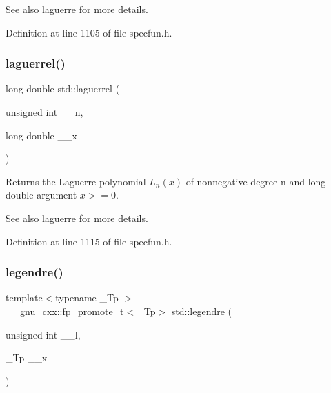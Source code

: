 \begin{DoxySeeAlso}{See also}
\hyperlink{group__tr29124__math__spec__func_ga9d7b24a11dad27690387405548973ef9}{laguerre} for more details. 
\end{DoxySeeAlso}


Definition at line 1105 of file specfun.\+h.

\mbox{\label{group__tr29124__math__spec__func_gaaf8b141edf9163b37ea4f2ed3e0191fc}} 
\subsubsection{\texorpdfstring{laguerrel()}{laguerrel()}}
{\footnotesize\ttfamily long double std\+::laguerrel (\begin{DoxyParamCaption}\item[{unsigned int}]{\+\_\+\+\_\+n,  }\item[{long double}]{\+\_\+\+\_\+x }\end{DoxyParamCaption})\hspace{0.3cm}{\ttfamily [inline]}}

Returns the Laguerre polynomial $ L_n(x) $ of nonnegative degree {\ttfamily n} and {\ttfamily long double} argument $ x >= 0 $.

\begin{DoxySeeAlso}{See also}
\hyperlink{group__tr29124__math__spec__func_ga9d7b24a11dad27690387405548973ef9}{laguerre} for more details. 
\end{DoxySeeAlso}


Definition at line 1115 of file specfun.\+h.

\mbox{\label{group__tr29124__math__spec__func_gad06811f4e139b0ba84235c1f0d34d86e}} 
\subsubsection{\texorpdfstring{legendre()}{legendre()}}
{\footnotesize\ttfamily template$<$typename \+\_\+\+Tp $>$ \\
\+\_\+\+\_\+gnu\+\_\+cxx\+::fp\+\_\+promote\+\_\+t$<$\+\_\+\+Tp$>$ std\+::legendre (\begin{DoxyParamCaption}\item[{unsigned int}]{\+\_\+\+\_\+l,  }\item[{\+\_\+\+Tp}]{\+\_\+\+\_\+x }\end{DoxyParamCaption})\hspace{0.3cm}{\ttfamily [inline]}}

